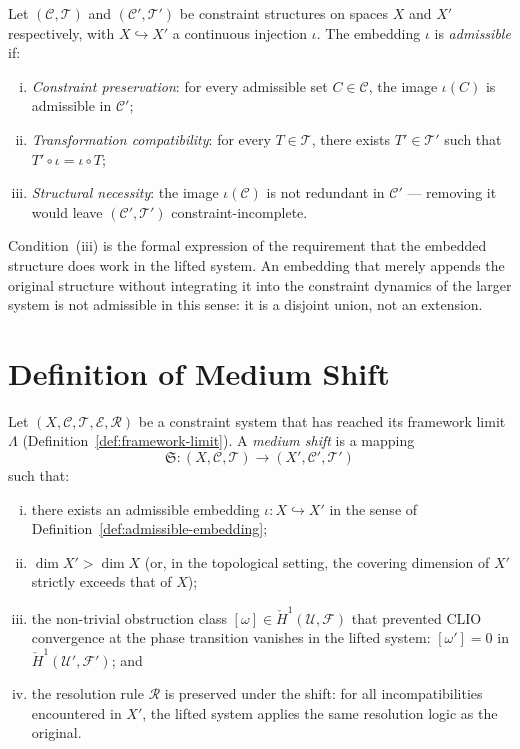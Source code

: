 \documentclass[11pt,openany]{book}
\begin{document}
\begin{definition}
\label{def:admissible-embedding}
Let $(\mathcal{C}, \mathcal{T})$ and $(\mathcal{C}',
\mathcal{T}')$ be constraint structures on spaces $X$ and
$X'$ respectively, with $X \hookrightarrow X'$ a
continuous injection $\iota$.  The embedding $\iota$ is
\emph{admissible} if:
\begin{enumerate}[(i)]
  \item \emph{Constraint preservation}: for every
    admissible set $C \in \mathcal{C}$, the image
    $\iota(C)$ is admissible in $\mathcal{C}'$;
  \item \emph{Transformation compatibility}: for every
    $T \in \mathcal{T}$, there exists $T' \in \mathcal{T}'$
    such that $T' \circ \iota = \iota \circ T$;
  \item \emph{Structural necessity}: the image
    $\iota(\mathcal{C})$ is not redundant in
    $\mathcal{C}'$ --- removing it would leave
    $(\mathcal{C}', \mathcal{T}')$ constraint-incomplete.
\end{enumerate}
\end{definition}

Condition~(iii) is the formal expression of the requirement
that the embedded structure does work in the lifted system.
An embedding that merely appends the original structure
without integrating it into the constraint dynamics of the
larger system is not admissible in this sense: it is a
disjoint union, not an extension.

\section{Definition of Medium Shift}
\label{sec:definition-medium}

\begin{definition}
\label{def:medium-shift}
Let $(X, \mathcal{C}, \mathcal{T}, \mathcal{E},
\mathcal{R})$ be a constraint system that has reached its
framework limit $\Lambda$
(Definition~\ref{def:framework-limit}).  A \emph{medium
shift} is a mapping
\[
  \mathfrak{S} : (X, \mathcal{C}, \mathcal{T})
  \longrightarrow (X', \mathcal{C}', \mathcal{T}')
\]
such that:
\begin{enumerate}[(i)]
  \item there exists an admissible embedding
    $\iota : X \hookrightarrow X'$ in the sense of
    Definition~\ref{def:admissible-embedding};
  \item $\dim X' > \dim X$ (or, in the topological
    setting, the covering dimension of $X'$ strictly
    exceeds that of $X$);
  \item the non-trivial obstruction class
    $[\omega] \in \check{H}^1(\mathcal{U}, \mathcal{F})$
    that prevented CLIO convergence at the phase transition
    vanishes in the lifted system:
    $[\omega'] = 0$ in
    $\check{H}^1(\mathcal{U}', \mathcal{F}')$; and
  \item the resolution rule $\mathcal{R}$ is preserved
    under the shift: for all incompatibilities encountered
    in $X'$, the lifted system applies the same
    resolution logic as the original.
\end{enumerate}
\end{definition}
\end{document}
